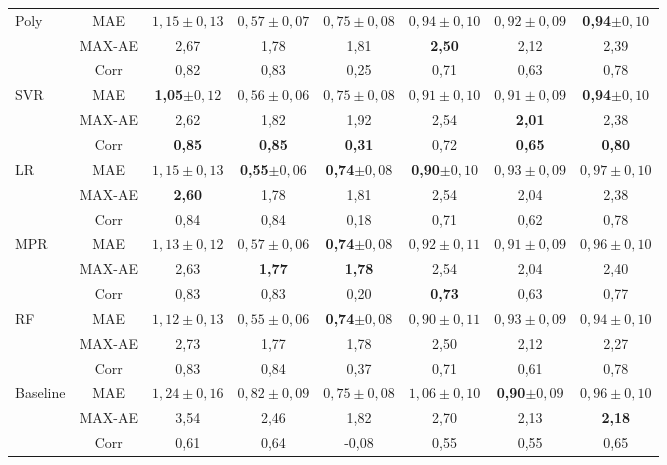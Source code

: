 \begin{table}[]
\begin{center}
\begin{tabular}{lc||c|c|c|c|c|c}
			\hline \hline
			\multirow{3}{*}{Poly}
			& MAE & $1,15\pm0,13$ & $0,57\pm0,07$ & $0,75\pm0,08$ & $0,94\pm0,10$ & $0,92\pm0,09$ & \textbf{0,94}$\pm0,10$\\
			& MAX-AE & 2,67 & 1,78 & 1,81 & \textbf{2,50} & 2,12 & 2,39 \\
			& Corr   & 0,82 & 0,83 & 0,25 & 0,71 & 0,63 & 0,78 \\
			\hline
			\multirow{3}{*}{SVR}
			& MAE & \textbf{1,05}$\pm0,12$ & $0,56\pm0,06$ & $0,75\pm0,08$ & $0,91\pm0,10$ & $0,91\pm0,09$ & \textbf{0,94}$\pm0,10$\\
			& MAX-AE & 2,62 & 1,82 & 1,92 & 2,54 & \textbf{2,01} & 2,38 \\
			& Corr   & \textbf{0,85} & \textbf{0,85} & \textbf{0,31} & 0,72 & \textbf{0,65} & \textbf{0,80} \\
			\hline
			\multirow{3}{*}{LR}
			& MAE & $1,15\pm0,13$ & \textbf{0,55}$\pm0,06$ & \textbf{0,74}$\pm0,08$ & \textbf{0,90}$\pm0,10$ & $0,93\pm0,09$ & $0,97\pm0,10$\\
			& MAX-AE & \textbf{2,60} & 1,78 & 1,81 & 2,54 & 2,04 & 2,38 \\
			& Corr   & 0,84 & 0,84 & 0,18 & 0,71 & 0,62 & 0,78 \\
			\hline
			\multirow{3}{*}{MPR}
			& MAE & $1,13\pm0,12$ & $0,57\pm0,06$ & \textbf{0,74}$\pm0,08$ & $0,92\pm0,11$ & $0,91\pm0,09$ & $0,96\pm0,10$\\
			& MAX-AE & 2,63 & \textbf{1,77} & \textbf{1,78} & 2,54 & 2,04 & 2,40 \\
			& Corr   & 0,83 & 0,83 & 0,20 & \textbf{0,73} & 0,63 & 0,77 \\			
			\hline
			\multirow{3}{*}{RF}
			& MAE & $1,12\pm0,13$ & $0,55\pm0,06$ & \textbf{0,74}$\pm0,08$ & $0,90\pm0,11$ & $0,93\pm0,09$ & $0,94\pm0,10$\\
			& MAX-AE & 2,73 & 1,77 & 1,78 & 2,50 & 2,12 & 2,27 \\
			& Corr   & 0,83 & 0,84 & 0,37 & 0,71 & 0,61 & 0,78 \\
			\hline
			\multirow{3}{*}{Baseline} 
			& MAE & $1,24\pm{0,16}$ & $0,82\pm{0,09}$ & $0,75\pm{0,08}$ & $1,06\pm{0,10}$ & \textbf{0,90}$\pm{0,09}$ & $0,96\pm{0,10}$ \\
			&MAX-AE & 3,54 & 2,46 & 1,82 & 2,70 & 2,13 & \textbf{2,18}\\
			&Corr   & 0,61 & 0,64 &-0,08 & 0,55 & 0,55 & 0,65\\

		\end{tabular}
	\end{center}
	\label{tab:testset}
\end{table}

